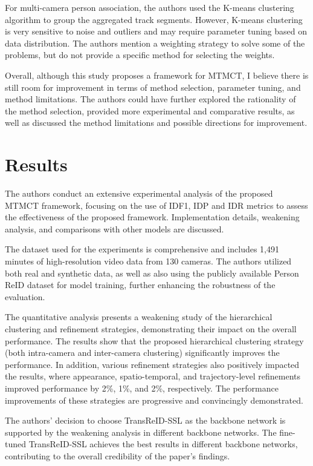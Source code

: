 \documentclass[a4paper,10pt,conference]{COMP9517}
\begin{document}
For multi-camera person association, the authors used the K-means clustering algorithm to group the aggregated track segments. However, K-means clustering is very sensitive to noise and outliers and may require parameter tuning based on data distribution. The authors mention a weighting strategy to solve some of the problems, but do not provide a specific method for selecting the weights.

Overall, although this study proposes a framework for MTMCT, I believe there is still room for improvement in terms of method selection, parameter tuning, and method limitations. The authors could have further explored the rationality of the method selection, provided more experimental and comparative results, as well as discussed the method limitations and possible directions for improvement.


\section{Results}
The authors conduct an extensive experimental analysis of the proposed MTMCT framework, focusing on the use of IDF1, IDP and IDR metrics to assess the effectiveness of the proposed framework. Implementation details, weakening analysis, and comparisons with other models are discussed.

The dataset used for the experiments is comprehensive and includes 1,491 minutes of high-resolution video data from 130 cameras. The authors utilized both real and synthetic data, as well as also using the publicly available Person ReID dataset for model training, further enhancing the robustness of the evaluation.

The quantitative analysis presents a weakening study of the hierarchical clustering and refinement strategies, demonstrating their impact on the overall performance. The results show that the proposed hierarchical clustering strategy (both intra-camera and inter-camera clustering) significantly improves the performance. In addition, various refinement strategies also positively impacted the results, where appearance, spatio-temporal, and trajectory-level refinements improved performance by 2\%, 1\%, and 2\%, respectively. The performance improvements of these strategies are progressive and convincingly demonstrated.

The authors' decision to choose TransReID-SSL as the backbone network is supported by the weakening analysis in different backbone networks. The fine-tuned TransReID-SSL achieves the best results in different backbone networks, contributing to the overall credibility of the paper's findings.
\end{document}
